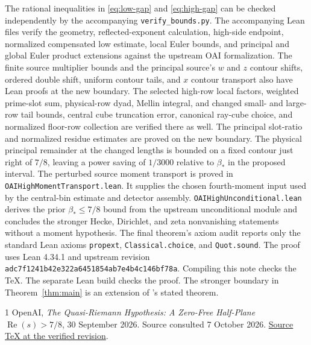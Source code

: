\documentclass[11pt]{article}
\newcommand{\Ree}{\operatorname{Re}}
\begin{document}
The rational inequalities in \eqref{eq:low-gap} and \eqref{eq:high-gap}
can be checked independently by the accompanying \texttt{verify\_bounds.py}.
The accompanying Lean files verify the geometry, reflected-exponent
calculation, high-side endpoint, normalized compensated low estimate,
local Euler bounds, and principal and global Euler product extensions against
the upstream OAI formalization. The finite source multiplier bounds and
the principal source's $w$ and $z$ contour shifts, ordered double shift,
uniform contour tails, and $x$ contour transport also have Lean proofs at
the new boundary. The selected high-row local factors, weighted prime-slot
sum, physical-row dyad, Mellin integral, and changed small- and large-row
tail bounds, central cube truncation error, canonical ray-cube choice, and
normalized floor-row collection are verified there as well.
The principal slot-ratio and normalized residue estimates are proved on the
new boundary. The physical principal remainder at the changed lengths is
bounded on a fixed contour just right of $7/8$, leaving a power saving of
$1/3000$ relative to $\beta_*$ in the proposed interval.
The perturbed source moment transport is proved in
\texttt{OAIHighMomentTransport.lean}. It supplies the chosen fourth-moment
input used by the central-bin estimate and detector assembly.
\texttt{OAIHighUnconditional.lean} derives the prior $\beta_*\le7/8$ bound
from the upstream unconditional module and concludes the stronger Hecke,
Dirichlet, and zeta nonvanishing statements without a moment hypothesis.
The final theorem's axiom audit reports only the standard Lean axioms
\texttt{propext}, \texttt{Classical.choice}, and \texttt{Quot.sound}.
The proof uses Lean 4.34.1 and upstream revision
\texttt{adc7f1241b42e322a6451854ab7e4b4c146bf78a}.
Compiling this note checks the TeX. The separate Lean build checks the proof.
The stronger boundary in Theorem~\ref{thm:main} is an extension of
\cite{OAI}'s stated theorem.

\begin{thebibliography}{1}
OpenAI, \emph{The Quasi-Riemann Hypothesis: A Zero-Free Half-Plane
$\Ree(s)>7/8$}, 30 September 2026. Source consulted 7 October 2026.
\href{https://github.com/openai/math/blob/adc7f1241b42e322a6451854ab7e4b4c146bf78a/preprints/The-Quasi-Riemann-Hypothesis-September-30-2026/build/paper.tex}{Source TeX at the verified revision}.
\end{thebibliography}
\end{document}
